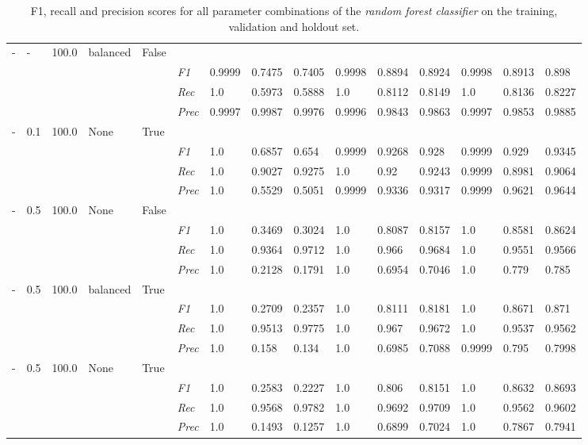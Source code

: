 \begin{table}[H]
\begin{tabularx}{\textwidth}{XXXXX|X|XXX|XXX|XXX}
    - & - & 100.0 & balanced & False& & & & & & & & & \\
    & & & & & \textit{F1} & 0.9999 & 0.7475 & 0.7405 & 0.9998 & 0.8894        & 0.8924        & 0.9998        & 0.8913        & 0.898        \\
    & & & & & \textit{Rec} & 1.0 & 0.5973 & 0.5888    & 1.0 & 0.8112    & 0.8149    & 1.0    & 0.8136    & 0.8227    \\
    & & & & & \textit{Prec} & 0.9997 & 0.9987 & 0.9976 & 0.9996 & 0.9843 & 0.9863 & 0.9997 & 0.9853 & 0.9885 \\ \midrule
    - & 0.1 & 100.0 & None & True& & & & & & & & & \\
    & & & & & \textit{F1} & 1.0 & 0.6857 & 0.654 & 0.9999 & 0.9268        & 0.928        & 0.9999        & 0.929        & 0.9345        \\
    & & & & & \textit{Rec} & 1.0 & 0.9027 & 0.9275    & 1.0 & 0.92    & 0.9243    & 0.9999    & 0.8981    & 0.9064    \\
    & & & & & \textit{Prec} & 1.0 & 0.5529 & 0.5051 & 0.9999 & 0.9336 & 0.9317 & 0.9999 & 0.9621 & 0.9644 \\ \midrule
    - & 0.5 & 100.0 & None & False& & & & & & & & & \\
    & & & & & \textit{F1} & 1.0 & 0.3469 & 0.3024 & 1.0 & 0.8087        & 0.8157        & 1.0        & 0.8581        & 0.8624        \\
    & & & & & \textit{Rec} & 1.0 & 0.9364 & 0.9712    & 1.0 & 0.966    & 0.9684    & 1.0    & 0.9551    & 0.9566    \\
    & & & & & \textit{Prec} & 1.0 & 0.2128 & 0.1791 & 1.0 & 0.6954 & 0.7046 & 1.0 & 0.779 & 0.785 \\ \midrule
    - & 0.5 & 100.0 & balanced & True& & & & & & & & & \\
    & & & & & \textit{F1} & 1.0 & 0.2709 & 0.2357 & 1.0 & 0.8111        & 0.8181        & 1.0        & 0.8671        & 0.871        \\
    & & & & & \textit{Rec} & 1.0 & 0.9513 & 0.9775    & 1.0 & 0.967    & 0.9672    & 1.0    & 0.9537    & 0.9562    \\
    & & & & & \textit{Prec} & 1.0 & 0.158 & 0.134 & 1.0 & 0.6985 & 0.7088 & 0.9999 & 0.795 & 0.7998 \\ \midrule
    - & 0.5 & 100.0 & None & True& & & & & & & & & \\
    & & & & & \textit{F1} & 1.0 & 0.2583 & 0.2227 & 1.0 & 0.806        & 0.8151        & 1.0        & 0.8632        & 0.8693        \\
    & & & & & \textit{Rec} & 1.0 & 0.9568 & 0.9782    & 1.0 & 0.9692    & 0.9709    & 1.0    & 0.9562    & 0.9602    \\
    & & & & & \textit{Prec} & 1.0 & 0.1493 & 0.1257 & 1.0 & 0.6899 & 0.7024 & 1.0 & 0.7867 & 0.7941 \\ \midrule
    \end{tabularx}
    \caption{F1, recall and precision scores for all parameter combinations of the \textit{random forest classifier} on the training, validation and holdout set. }
    \label{tab:all_results_random_forest}
    \end{table}
    
